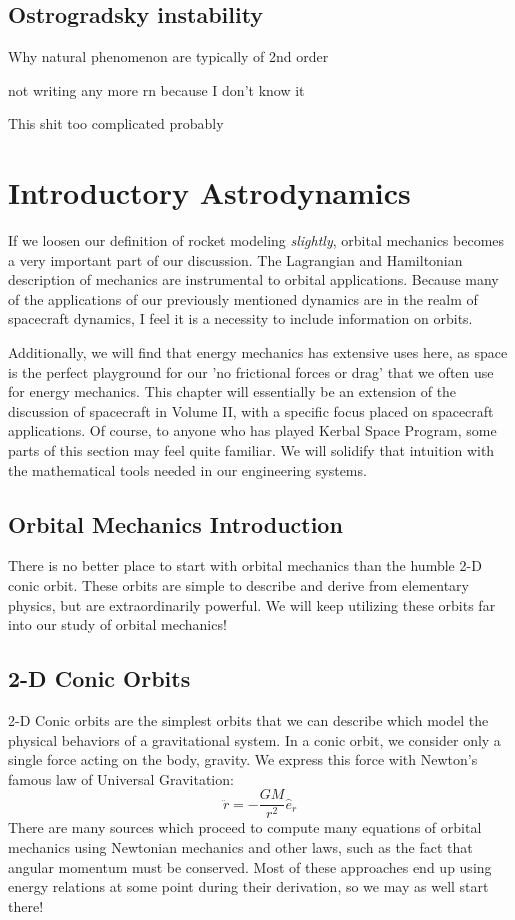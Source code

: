 \section{Ostrogradsky instability}
Why natural phenomenon are typically of 2nd order

not writing any more rn because I don't know it

This shit too complicated probably



\chapter{Introductory Astrodynamics}
If we loosen our definition of rocket modeling \textit{slightly}, orbital mechanics becomes a very important part of our discussion. The \gls{Lagrangian} and \gls{Hamiltonian} description of mechanics are instrumental to orbital applications. Because many of the applications of our previously mentioned dynamics are in the realm of spacecraft dynamics, I feel it is a necessity to include information on orbits. 

Additionally, we will find that energy mechanics has extensive uses here, as space is the perfect playground for our 'no frictional forces or drag' that we often use for energy mechanics. This chapter will essentially be an extension of the discussion of spacecraft in Volume II, with a specific focus placed on spacecraft applications. Of course, to anyone who has played Kerbal Space Program, some parts of this section may feel quite familiar. We will solidify that intuition with the mathematical tools needed in our engineering systems.

\section{Orbital Mechanics Introduction}
There is no better place to start with orbital mechanics than the humble 2-D conic orbit. These orbits are simple to describe and derive from elementary physics, but are extraordinarily powerful. We will keep utilizing these orbits far into our study of orbital mechanics!

\section{2-D Conic Orbits}
2-D Conic orbits are the simplest orbits that we can describe which model the physical behaviors of a gravitational system. In a conic orbit, we consider only a single force acting on the body, gravity. We express this force with Newton's famous law of Universal Gravitation:
$$\ddot{r}=-\frac{GM}{r^2}\hat{e}_r$$
There are many sources which proceed to compute many equations of orbital mechanics using Newtonian mechanics and other laws, such as the fact that angular momentum must be conserved. Most of these approaches end up using energy relations at some point during their derivation, so we may as well start there!

